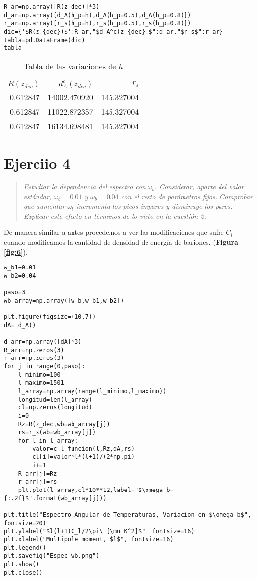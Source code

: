 \documentclass{article}
\begin{document}
\begin{lstlisting}[style=Python]
R_ar=np.array([R(z_dec)]*3)
d_ar=np.array([d_A(h_p=h),d_A(h_p=0.5),d_A(h_p=0.8)])
r_ar=np.array([r_s(h_p=h),r_s(h_p=0.5),r_s(h_p=0.8)])
dic={'$R(z_{dec})$':R_ar,"$d_A^c(z_{dec})$":d_ar,"$r_s$":r_ar}
tabla=pd.DataFrame(dic)
tabla
\end{lstlisting}

\begin{table}[h]
\centering
\begin{tabular}{rrr}
\toprule
  $R(z_{dec})$ &  $d_A^c(z_{dec})$ & $r_s$ \\
\midrule
      0.612847 &      14002.470920 &  145.327004 \\
      0.612847 &      11022.872357 &  145.327004 \\
      0.612847 &      16134.698481 &  145.327004 \\
\bottomrule
\end{tabular}
\caption{\label{tab:2} Tabla de las variaciones de $h$}
\end{table}

\section{Ejerciio 4}
\begin{quote}
\textit{Estudiar la dependencia del espectro con $\omega_b$. Considerar, aparte del valor estándar, $\omega_b = 0.01$ y $\omega_b = 0.04$ con el resto de parámetros fijos. Comprobar que aumentar $\omega_b$ incrementa los picos impares y disminuye los pares. Explicar este efecto en términos de lo visto en la cuestión 2.}
\end{quote}

De manera similar a antes procedemos a ver las modificaciones que sufre $C_l$ cuando modificamos la cantidad de densidad de energía de bariones. (\textbf{Figura \ref{fig:6}}).
\begin{lstlisting}[style=Python]
w_b1=0.01
w_b2=0.04

paso=3
wb_array=np.array([w_b,w_b1,w_b2])

plt.figure(figsize=(10,7))
dA= d_A()

d_arr=np.array([dA]*3)
R_arr=np.zeros(3)
r_arr=np.zeros(3)
for j in range(0,paso):
    l_minimo=100
    l_maximo=1501
    l_array=np.array(range(l_minimo,l_maximo))
    longitud=len(l_array)
    cl=np.zeros(longitud)
    i=0    
    Rz=R(z_dec,wb=wb_array[j])
    rs=r_s(wb=wb_array[j])
    for l in l_array:
        valor=c_l_funcion(l,Rz,dA,rs)
        cl[i]=valor*l*(l+1)/(2*np.pi)
        i+=1
    R_arr[j]=Rz
    r_arr[j]=rs
    plt.plot(l_array,cl*10**12,label="$\omega_b={:.2f}$".format(wb_array[j]))

plt.title("Espectro Angular de Temperaturas, Variacion en $\omega_b$", fontsize=20)
plt.ylabel("$l(l+1)C_l/2\pi\ [\mu K^2]$", fontsize=16)
plt.xlabel("Multipole moment, $l$", fontsize=16)
plt.legend()
plt.savefig("Espec_wb.png")
plt.show()
plt.close()
\end{lstlisting}
\end{document}
